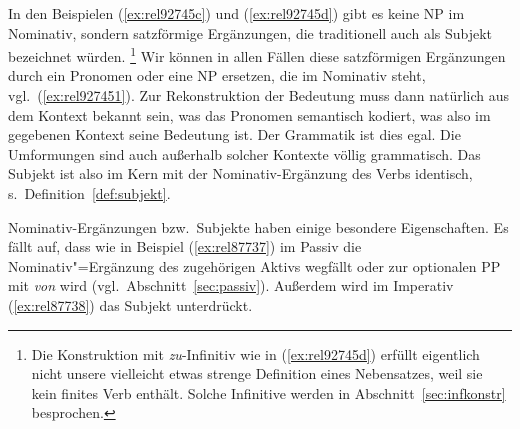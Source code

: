 In den Beispielen (\ref{ex:rel92745c}) und (\ref{ex:rel92745d}) gibt es keine NP im Nominativ, sondern satzförmige Ergänzungen, die traditionell auch als Subjekt bezeichnet würden.%
\footnote{Die Konstruktion mit \textit{zu}-Infinitiv wie in (\ref{ex:rel92745d}) erfüllt eigentlich nicht unsere vielleicht etwas strenge Definition eines Nebensatzes, weil sie kein finites Verb enthält.
Solche Infinitive werden in Abschnitt~\ref{sec:infkonstr} besprochen.}
Wir können in allen Fällen diese satzförmigen Ergänzungen durch ein Pronomen oder eine NP ersetzen, die im Nominativ steht, vgl.\ (\ref{ex:rel927451}).
Zur Rekonstruktion der Bedeutung muss dann natürlich aus dem Kontext bekannt sein, was das Pronomen semantisch kodiert, was also im gegebenen Kontext seine Bedeutung ist.
Der Grammatik ist dies egal.
Die Umformungen sind auch außerhalb solcher Kontexte völlig grammatisch.
Das Subjekt ist also im Kern mit der Nominativ-Ergänzung des Verbs identisch, s.\ Definition~\ref{def:subjekt}.
\begin{exe}
  \ex\label{ex:rel927451}
  \begin{xlist}
  \end{xlist}
\end{exe}




Nominativ-Ergänzungen bzw.\ Subjekte haben einige besondere Eigenschaften.
Es fällt auf, dass wie in Beispiel (\ref{ex:rel87737}) im Passiv die Nominativ"=Ergänzung des zugehörigen Aktivs wegfällt oder zur optionalen PP mit \textit{von} wird (vgl.\ Abschnitt~\ref{sec:passiv}).
Außerdem wird im Imperativ (\ref{ex:rel87738}) das Subjekt unterdrückt.

\begin{exe}
  \ex\label{ex:rel87737}
  \begin{xlist}
  \end{xlist}
  \ex\label{ex:rel87738}
  \begin{xlist}
  \end{xlist}
\end{exe}

